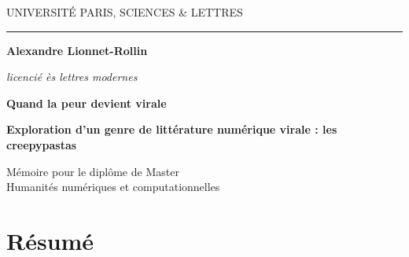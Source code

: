 \documentclass[12pt,a4paper,oneside,titlepage]{book} %
\begin{document}
\frontmatter
\begin{titlepage}
	\begin{center}
		
		\bigskip
		
		\begin{large}
			UNIVERSITÉ PARIS, SCIENCES \& LETTRES
		\end{large}
		\begin{center}\rule{2cm}{0.02cm}\end{center}
		
		\bigskip
		\bigskip
		\bigskip
		\begin{Large}
			\textbf{Alexandre Lionnet-Rollin}\\
		\end{Large}
		\begin{normalsize} \textit{licencié ès lettres modernes}\\
			
		\end{normalsize}
		
		\bigskip
		\bigskip
		\bigskip
		
		\begin{Huge}
			\textbf{Quand la peur devient virale}\\
		\end{Huge}
		\bigskip
		\bigskip
		\begin{LARGE}
		\textbf{Exploration d'un genre de littérature numérique virale : les creepypastas}\\
		\end{LARGE}
		
		\bigskip
		\bigskip
		\bigskip
		\begin{large}
		\end{large}
		\vfill
		
		\begin{large}
			Mémoire pour le diplôme de Master\\
			\og Humanités numériques et computationnelles \fg{} \\
		\end{large}
		
	\end{center}
\end{titlepage}

\thispagestyle{empty}

\cleardoublepage

\section*{Résumé}
\end{document}
